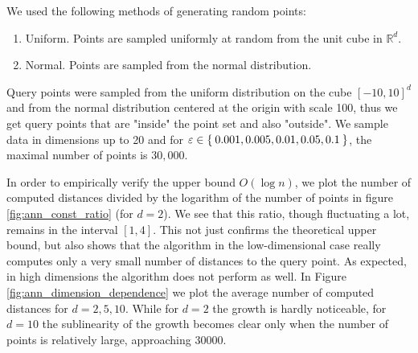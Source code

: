 \documentclass[a4paper,UKenglish,cleveref, autoref]{lipics-v2019}
\newcommand{\R}{\mathbb{R}}
\newcommand{\eps}{\varepsilon}
\begin{document}
We used the following methods of generating random points:
\begin{enumerate}
    \item Uniform. Points are sampled uniformly at random from the unit cube in $\R^d$.
    \item Normal. Points are sampled from the normal distribution.
\end{enumerate}
Query points were sampled from the uniform distribution on the cube $[-10, 10]^d$
and from the normal distribution centered at the origin with scale 100,
thus we get query points that are "inside" the point set and also "outside".
We sample data in dimensions up to 20 and for $\eps \in \Set{0.001, 0.005, 0.01, 0.05, 0.1}$,
the maximal number of points is $30,000$.

In order to empirically verify the upper bound $O(\log n)$,
we plot the number of computed distances divided
by the logarithm of the number of points in figure \ref{fig:ann_const_ratio} (for $d = 2$).
We see that this ratio, though fluctuating a lot, remains in the interval $[1,4]$. This not just confirms
the theoretical upper bound, but also shows that the algorithm in the low-dimensional case
really computes only a very small number of distances to the query point.
As expected, in high dimensions the algorithm does not perform as well.
In Figure \ref{fig:ann_dimension_dependence} we plot the average number of computed distances
for $d = 2, 5, 10$. While for $d = 2$ the growth is hardly noticeable, for $d = 10$
the sublinearity of the growth becomes clear only when the number of points is relatively large,
approaching 30000.



\end{document}
